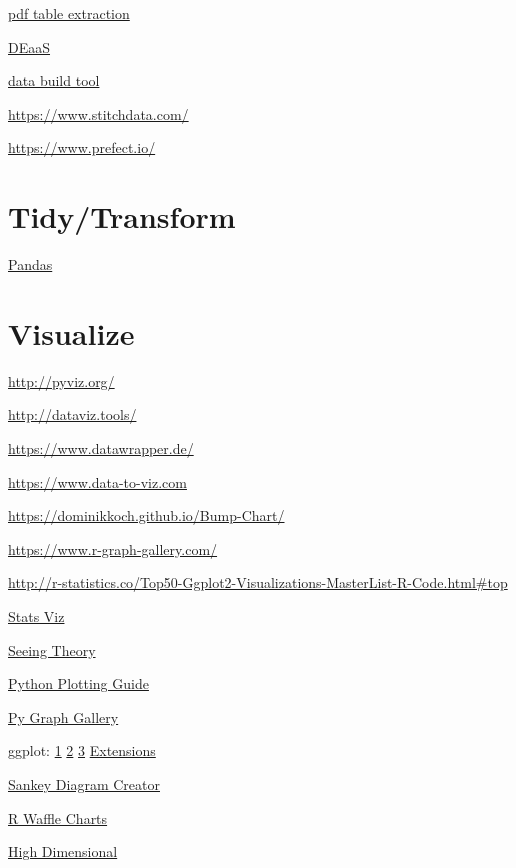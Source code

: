 \documentclass[]{book}
\begin{document}
\href{https://tabula.technology}{pdf table extraction}

\href{https://www.astronomer.io/}{DEaaS}

\href{https://www.getdbt.com/}{data build tool}

\url{https://www.stitchdata.com/}

\url{https://www.prefect.io/}

\section{Tidy/Transform}\label{tidytransform}

\href{http://tomaugspurger.github.io/modern-1.html}{Pandas}

\section{Visualize}\label{visualize-2}

\url{http://pyviz.org/}

\url{http://dataviz.tools/}

\url{https://www.datawrapper.de/}

\url{https://www.data-to-viz.com}

\url{https://dominikkoch.github.io/Bump-Chart/}

\url{https://www.r-graph-gallery.com/}

\url{http://r-statistics.co/Top50-Ggplot2-Visualizations-MasterList-R-Code.html\#top}

\href{http://emilkirkegaard.dk/understanding_statistics/}{Stats Viz}

\href{http://students.brown.edu/seeing-theory/}{Seeing Theory}

\href{http://pythonplot.com/}{Python Plotting Guide}

\href{https://python-graph-gallery.com}{Py Graph Gallery}

ggplot:
\href{https://www.pitt.edu/~naraehan/presentation/Graphs_and_Plots_using_Plotly.html}{1}
\textbar{} \href{https://plot.ly/python/table/}{2} \textbar{}
\href{https://plot.ly/python/html-reports/}{3} \textbar{}
\href{http://www.ggplot2-exts.org/gallery/}{Extensions}

\href{http://sankeymatic.com}{Sankey Diagram Creator}

\href{https://nsaunders.wordpress.com/2017/09/08/infographic-style-charts-using-the-r-waffle-package/}{R
Waffle Charts}

\href{https://research.googleblog.com/2016/12/open-sourcing-embedding-projector-tool.html}{High
Dimensional}
\end{document}
